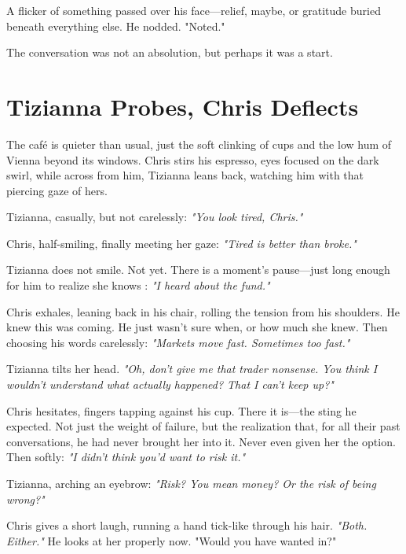 A flicker of something passed over his face—relief, maybe, or gratitude buried beneath everything else. He nodded. "Noted."

The conversation was not an absolution, but perhaps it was a start.

\newpage

\section*{Tizianna Probes, Chris Deflects}

The café is quieter than usual, just the soft clinking of cups and the low hum of Vienna beyond its windows. Chris stirs his espresso, eyes focused on the dark swirl, while across from him, Tizianna leans back, watching him with that piercing gaze of hers.

{Tizianna}, casually, but not carelessly: \textit{"You look tired, Chris."}

{Chris}, half-smiling, finally meeting her gaze: \textit{"Tired is better than broke."}

\smallskip

Tizianna does not smile. Not yet. There is a moment’s pause—just long enough for him to realize she knows : \textit{"I heard about the fund."}

\smallskip

Chris exhales, leaning back in his chair, rolling the tension from his shoulders. He knew this was coming. He just wasn’t sure when, or how much she knew. Then choosing his words carelessly: \textit{"Markets move fast. Sometimes too fast."}

\smallskip

Tizianna tilts her head. \textit{"Oh, don't give me that trader nonsense. You think I wouldn’t understand what actually happened? That I can’t keep up?"}

\smallskip

Chris hesitates, fingers tapping against his cup. There it is—the sting he expected. Not just the weight of failure, but the realization that, for all their past conversations, he had never brought her into it. Never even given her the option. Then softly: \textit{"I didn’t think you’d want to risk it."}

\smallskip

{Tizianna}, arching an eyebrow: \textit{"Risk? You mean money? Or the risk of being wrong?"}

\smallskip

Chris gives a short laugh, running a hand tick-like through his hair. \textit{"Both. Either."} He looks at her properly now. "Would you have wanted in?"


